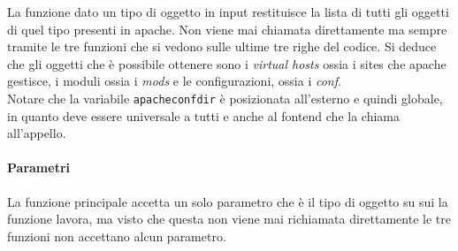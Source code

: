 \documentclass[11pt]{article}
\begin{document}
La funzione dato un tipo di oggetto in input restituisce la lista di tutti gli oggetti di quel tipo presenti in apache.
Non viene mai chiamata direttamente ma sempre tramite le tre funzioni che si vedono sulle ultime tre righe del codice.
Si deduce che gli oggetti che è possibile ottenere sono i \textit{virtual hosts} ossia i sites che apache gestisce,
i moduli ossia i \textit{mods} e le configurazioni, ossia i \textit{conf}.\\
Notare che la variabile \texttt{apacheconfdir} è posizionata all'esterno e quindi globale, in quanto deve essere universale
a tutti e anche al fontend che la chiama all'appello.
\paragraph{Parametri}
La funzione principale accetta un solo parametro che è il tipo di oggetto su sui la funzione lavora, ma visto che
questa non viene mai richiamata direttamente le tre funzioni non accettano alcun parametro.
\end{document}
